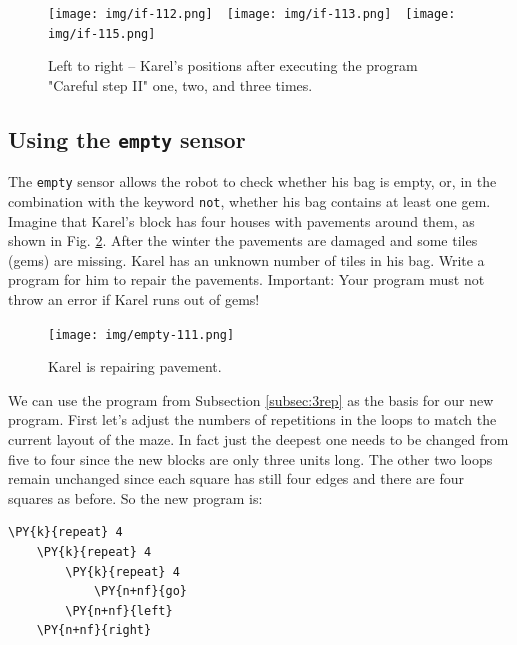 \begin{figure}[!ht]
\begin{center}
\texttt{[image: img/if-112.png]}\ \ 
\texttt{[image: img/if-113.png]}\ \ 
\texttt{[image: img/if-115.png]}
\vspace{-0mm}
\caption{Left to right -- Karel's positions after executing the program "Careful step II" 
         one, two, and three times.}
\label{fig:if-115}
\vspace{-12mm}
\end{center}
\end{figure}

\subsection{Using the {\tt empty} sensor}

The {\tt empty} sensor allows the robot to check whether his bag is empty,
or, in the combination with the keyword {\tt not}, whether his bag contains
at least one gem. Imagine that Karel's block has four houses with pavements 
around them, as shown in Fig. \ref{fig:empty-111}. After
the winter the pavements are damaged and some tiles (gems) are missing. Karel 
has an unknown number of tiles in his bag. Write a program for him to 
repair the pavements. Important: Your program must not throw an error if Karel 
runs out of gems!\\[-7mm]


\begin{figure}[!ht]
\begin{center}
\texttt{[image: img/empty-111.png]}
\vspace{-0mm}
\caption{Karel is repairing pavement.}
\label{fig:empty-111}
\vspace{-1cm}
\end{center}
\end{figure}
\newpage
\noindent
We can use the program from Subsection \ref{subsec:3rep} as the basis 
for our new program. First let's adjust the numbers of repetitions 
in the loops to match the current layout of the maze. In fact just 
the deepest one needs to be changed from five to four since the new 
blocks are only three units long. The other two loops remain 
unchanged since each square has still four edges and there are
four squares as before. So the new program is:\\

\begin{bbox}
\begin{Verbatim}[commandchars=\\\{\}]
\PY{k}{repeat} 4
    \PY{k}{repeat} 4
        \PY{k}{repeat} 4
            \PY{n+nf}{go}
        \PY{n+nf}{left}
    \PY{n+nf}{right}
\end{Verbatim}
\end{bbox}
\vspace{6mm}

